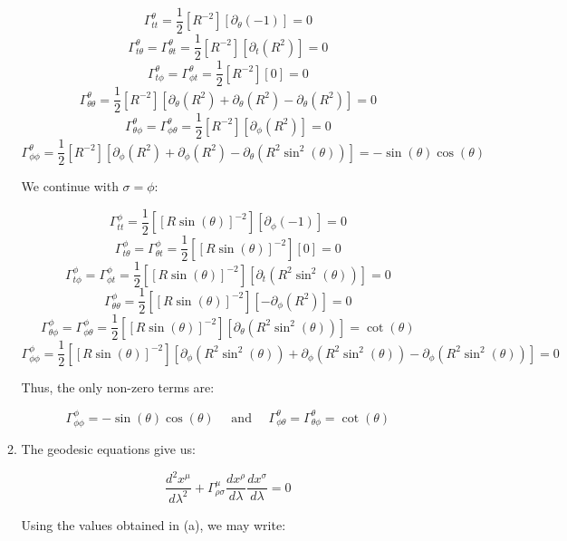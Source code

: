 \begin{enumerate}
\begin{enumerate}
          $$\Gamma^{\theta}_{tt}=\frac{1}{2}\left[ R^{-2} \right]\left[ \partial_{\theta}(-1)\right]=0$$
          $$\Gamma^{\theta}_{t\theta}=\Gamma^{\theta}_{\theta t}=\frac{1}{2}\left[ R^{-2} \right]\left[ \partial_{t}(R^2)\right]=0$$
          $$\Gamma^{\theta}_{t\phi}=\Gamma^{\theta}_{\phi t}=\frac{1}{2}\left[ R^{-2} \right]\left[ 0\right]=0$$
          $$\Gamma^{\theta}_{\theta\theta}=\frac{1}{2}\left[ R^{-2} \right]\left[ \partial_{\theta}(R^2)+\partial_{\theta}(R^2)-\partial_{\theta}(R^2)  \right]=0$$
          $$\Gamma^{\theta}_{\theta\phi}=\Gamma^{\theta}_{\phi\theta}=\frac{1}{2}\left[ R^{-2} \right]\left[ \partial_{\phi}(R^2)\right]=0$$
          $$\Gamma^{\theta}_{\phi\phi}=\frac{1}{2}\left[ R^{-2} \right]\left[ \partial_{\phi}(R^2)+\partial_{\phi}(R^2)-\partial_{\theta}(R^2\sin^2(\theta))  \right]=-\sin(\theta)\cos(\theta)$$

          We continue with $\sigma=\phi$:

          $$\Gamma^{\phi}_{tt}=\frac{1}{2}\left[ [R\sin(\theta)]^{-2} \right]\left[ \partial_{\phi}(-1)\right]=0$$
          $$\Gamma^{\phi}_{t\theta}=\Gamma^{\phi}_{\theta t}=\frac{1}{2}\left[ [R\sin(\theta)]^{-2} \right]\left[ 0 \right]=0$$
          $$\Gamma^{\phi}_{t\phi}=\Gamma^{\phi}_{\phi t}=\frac{1}{2}\left[ [R\sin(\theta)]^{-2} \right]\left[ \partial_{t}(R^2\sin^2(\theta))\right]=0$$
          $$\Gamma^{\phi}_{\theta\theta}=\frac{1}{2}\left[ [R\sin(\theta)]^{-2} \right]\left[ -\partial_{\phi}(R^2)  \right]=0$$
          $$\Gamma^{\phi}_{\theta\phi}=\Gamma^{\phi}_{\phi\theta}=\frac{1}{2}\left[ [R\sin(\theta)]^{-2} \right]\left[ \partial_{\theta}(R^2\sin^2(\theta))\right]=\cot(\theta)$$
          $$\Gamma^{\phi}_{\phi\phi}=\frac{1}{2}\left[ [R\sin(\theta)]^{-2} \right]\left[ \partial_{\phi}(R^2\sin^2(\theta))+\partial_{\phi}(R^2\sin^2(\theta))-\partial_{\phi}(R^2\sin^2(\theta))  \right]=0$$

          Thus, the only non-zero terms are:

          $$\boxed{\Gamma_{\phi\phi}^{\phi}=-\sin(\theta)\cos(\theta)\quad\text{ and }\quad\Gamma^{\theta}_{\phi\theta}=\Gamma^{\theta}_{\theta\phi}=\cot(\theta)}$$

      \item 

        The geodesic equations give us:

        $$\frac{d^2x^{\mu}}{d\lambda^2}+\Gamma^{\mu}_{\rho\sigma}\frac{dx^{\rho}}{d\lambda}\frac{dx^{\sigma}}{d\lambda}=0$$

        Using the values obtained in (a), we may write:


\end{enumerate}
\end{enumerate}
